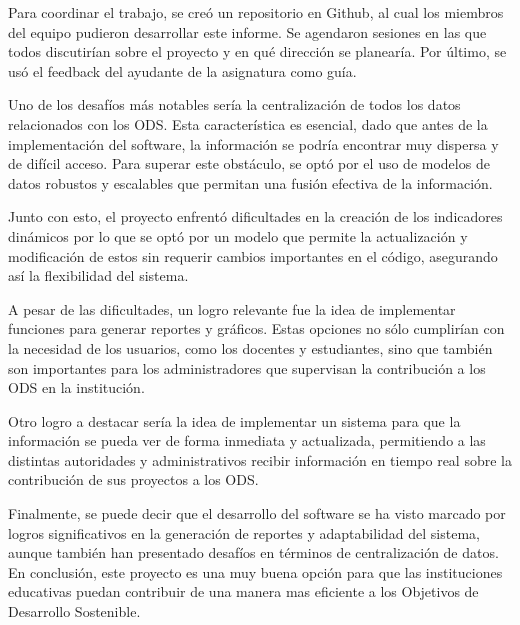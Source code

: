 \documentclass[12pt]{article}
\begin{document}
Para coordinar el trabajo, se creó un repositorio en Github, al cual los miembros del equipo pudieron desarrollar este informe. Se agendaron sesiones en las que todos discutirían sobre el proyecto y en qué dirección se planearía. Por último, se usó el feedback del ayudante de la asignatura como guía.

Uno de los desafíos más notables sería la centralización de todos los datos relacionados con los ODS. Esta característica es esencial, dado que antes de la implementación del software, la información se podría encontrar muy dispersa y de difícil acceso. Para superar este obstáculo, se optó por el uso de modelos de datos robustos y escalables que permitan una fusión efectiva de la información.

Junto con esto, el proyecto enfrentó dificultades en la creación de los indicadores dinámicos por lo que se optó por un modelo que permite la actualización y modificación de estos sin requerir cambios importantes en el código, asegurando así la flexibilidad del sistema.

A pesar de las dificultades, un logro relevante fue la idea de implementar funciones para generar reportes y gráficos. Estas opciones no sólo cumplirían con la necesidad de los usuarios, como los docentes y estudiantes, sino que también son importantes para los administradores que supervisan la contribución a los ODS en la institución.

Otro logro a destacar sería la idea de implementar un sistema para que la información se pueda ver de forma inmediata y actualizada, permitiendo a las distintas autoridades y administrativos recibir información en tiempo real sobre la contribución de sus proyectos a los ODS.

Finalmente, se puede decir que el desarrollo del software se ha visto marcado por logros significativos en la generación de reportes y adaptabilidad del sistema, aunque también han presentado desafíos en términos de centralización de datos. En conclusión, este proyecto es una muy buena opción para que las instituciones educativas puedan contribuir de una manera mas eficiente a los Objetivos de Desarrollo Sostenible.
\end{document}
